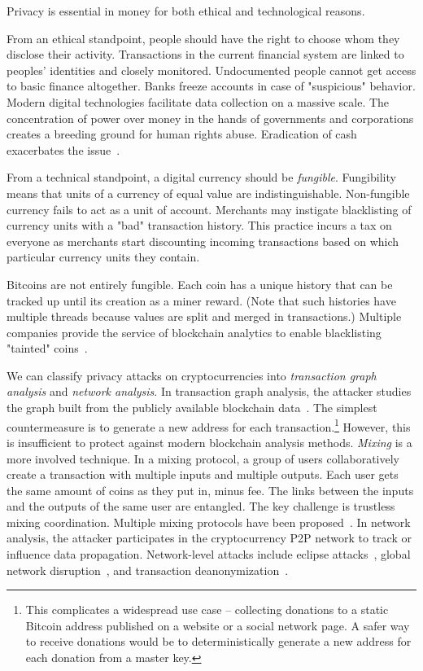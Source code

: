 Privacy is essential in money for both ethical and technological reasons.

From an ethical standpoint, people should have the right to choose whom they disclose their activity.
Transactions in the current financial system are linked to peoples' identities and closely monitored.
Undocumented people cannot get access to basic finance altogether.
Banks freeze accounts in case of "suspicious" behavior.
Modern digital technologies facilitate data collection on a massive scale.
The concentration of power over money in the hands of governments and corporations creates a breeding ground for human rights abuse.
Eradication of cash exacerbates the issue~\cite{Brito2019}.

From a technical standpoint, a digital currency should be \textit{fungible}.
Fungibility means that units of a currency of equal value are indistinguishable.
Non-fungible currency fails to act as a unit of account.
Merchants may instigate blacklisting of currency units with a "bad" transaction history.
This practice incurs a tax on everyone as merchants start discounting incoming transactions based on which particular currency units they contain.

Bitcoins are not entirely fungible.
Each coin has a unique history that can be tracked up until its creation as a miner reward.
(Note that such histories have multiple threads because values are split and merged in transactions.)
Multiple companies provide the service of blockchain analytics to enable blacklisting "tainted" coins~\cite{Elliptic, Chainalysis}.

We can classify privacy attacks on cryptocurrencies into \textit{transaction graph analysis} and \textit{network analysis}.
In transaction graph analysis, the attacker studies the graph built from the publicly available blockchain data~\cite{Reid2011, Androulaki2013, Meiklejohn2013, Ober2013, Ron2013}.
The simplest countermeasure is to generate a new address for each transaction.\footnote{This complicates a widespread use case -- collecting donations to a static Bitcoin address published on a website or a social network page. A safer way to receive donations would be to deterministically generate a new address for each donation from a master key.}
However, this is insufficient to protect against modern blockchain analysis methods.
\textit{Mixing} is a more involved technique.
In a mixing protocol, a group of users collaboratively create a transaction with multiple inputs and multiple outputs.
Each user gets the same amount of coins as they put in, minus fee.
The links between the inputs and the outputs of the same user are entangled.
The key challenge is trustless mixing coordination.
Multiple mixing protocols have been proposed~\cite{Maxwell2013, Bonneau2014, Ruffing2014, Valenta2015}.
In network analysis, the attacker participates in the cryptocurrency P2P network to track or influence data propagation.
Network-level attacks include eclipse attacks~\cite{Marcus2018, Henningsen2019}, global network disruption~\cite{Apostolaki2017}, and transaction deanonymization~\cite{Biryukov2014}.


